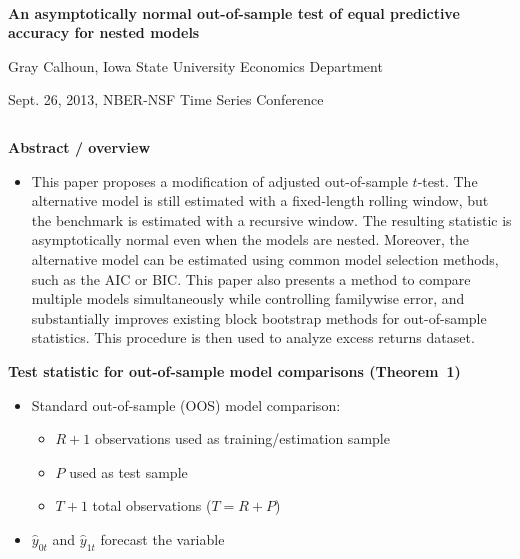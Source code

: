 \documentclass[final]{beamer}
\begin{document}
\begin{frame}{\\\centering \textbf{\huge An asymptotically normal out-of-sample
    test of equal predictive accuracy for nested models}}
  \centering

  Gray Calhoun, Iowa State University Economics Department

  Sept. 26, 2013, NBER-NSF Time Series Conference

  \begin{columns}[t]
    \begin{column}{.23\textwidth}

      \begin{block}{\textbf{Abstract / overview}}
        \begin{itemize}
        \item[] This paper proposes a modification of
           adjusted
          out-of-sample $t$-test.  The alternative model is still
          estimated with a fixed-length rolling window, but the
          benchmark is estimated with a recursive window. The
          resulting statistic is asymptotically normal even when the
          models are nested.  Moreover, the alternative model can be
          estimated using common model selection methods, such as the
          AIC or BIC.  This paper also presents a method to compare
          multiple models simultaneously while controlling familywise
          error, and substantially improves existing block bootstrap
          methods for out-of-sample statistics.  This procedure is
          then used to analyze
           excess returns
          dataset.
        \end{itemize}
      \end{block}
      \bigskip
      \begin{block}{\textbf{Test statistic for out-of-sample model
          comparisons (Theorem~1)}}
        \begin{itemize}
        \item Standard out-of-sample (OOS) model comparison:
          \begin{itemize}
          \item $R+1$ observations used as training/estimation sample
          \item $P$ used as test sample
          \item $T+1$ total observations ($T = R + P$)
          \end{itemize}
        \item $\hat{y}_{0t}$ and $\hat{y}_{1t}$ forecast the variable

\end{itemize}
\end{block}
\end{column}
\end{columns}
\end{frame}
\end{document}

